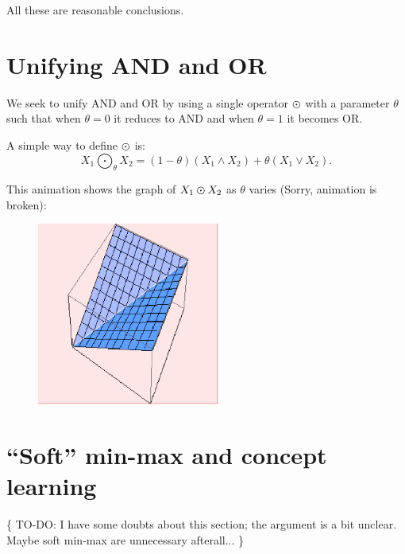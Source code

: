 All these are reasonable conclusions.

\section{Unifying AND and OR}
\label{sec:unifying-AND-and-OR}
We seek to unify AND and OR by using a single operator $\varodot$ with a parameter $\theta$ such that when $\theta = 0$ it reduces to AND and when $\theta = 1$ it becomes OR.

A simple way to define $\varodot$ is:
\begin{equation}
X_1 \bigodot_\theta X_2 = (1-\theta) (X_1 \wedge X_2) + \theta (X_1 \vee X_2).
\end{equation}

This animation shows the graph of $X_1 \varodot X_2$ as $\theta$ varies (Sorry, animation is broken):
\begin{figure}[H]
\centering
\includegraphics[width=6cm, height=6cm, bb = 0 0 300 300]{unified-AND-OR.eps}
\end{figure}

\section{``Soft'' min-max and concept learning}

\{ TO-DO:  I have some doubts about this section; the argument is a bit unclear.  Maybe soft min-max are unnecessary afterall... \}

